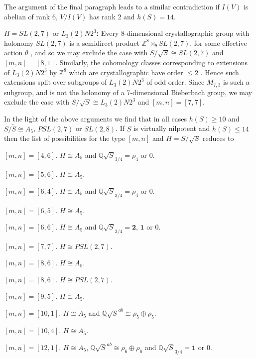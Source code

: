 \documentclass[12pt]{amsart}
\renewcommand{\geq}{\geqslant}
\renewcommand{\leq}{\leqslant}
\begin{document}
The argument of the final paragraph  leads to a similar contradiction if $I(V)$ 
is abelian of rank 6, $V/I(V)$ has rank 2  and $h(S)=14$. 


\medskip
\noindent$H=SL(2,7)$ or $L_3(2)N2^3${\bf :}
Every 8-dimensional crystallographic group with holonomy $SL(2,7)$
is a semidirect product $\mathbb{Z}^8\rtimes_\theta{SL(2,7)}$,
for some effective action $\theta$ \cite[page 295]{HP},
and so we may exclude the case with $S/\sqrt{S}\cong{SL(2,7)}$ and $[m,n]=[8,1]$.
Similarly, the cohomology classes corresponding to extensions
of $L_3(2)N2^3$ by $\mathbb{Z}^8$ which are crystallographic 
have order $\leq2$ \cite[page 298]{HP}.
Hence such extensions split over subgroups of $L_3(2)N2^3$ of odd order.
Since $M_{7,3}$ is such a subgroup, 
and is not the holonomy of a 7-dimensional Bieberbach group,
we may exclude the case with $S/\sqrt{S}\cong{L_3(2)N2^3}$ and $[m,n]=[7,7]$.

\medskip
In the light of the above arguments we find that in all cases
${h(S)\geq10}$ and $S/\widetilde{S}\cong{A_5}$,  $PSL(2,7)$ or $SL(2,8)$.
If $S$ is virtually nilpotent and $h(S)\leq14$ then the list of possibilities for 
the type $[m,n]$ and $H=S/\sqrt{S}$ reduces to

$[m,n]=[4,6]$.  $H\cong{A_5}$ and $\mathbb{Q}\sqrt{S}_{3/4}=\rho_4$ or 0.

$[m,n]=[5,6]$.  $H\cong{A_5}$. 

$[m,n]=[6,4]$.   $H\cong{A_5}$ and $\mathbb{Q}\sqrt{S}_{3/4}=\rho_4$ or 0.

$[m,n]=[6,5]$.   $H\cong{A_5}$.

$[m,n]=[6,6]$.  $H\cong{A_5}$ and $\mathbb{Q}\sqrt{S}_{3/4}=\mathbf{2}$, 
$\mathbf{1}$ or 0.

$[m,n]=[7,7]$.  $H\cong{PSL(2,7)}$.

$[m,n]=[8,6]$.  $H\cong{A_5}$.

$[m,n]=[8,6]$.  $H\cong{PSL(2,7)}$.

$[m,n]=[9,5]$.  $H\cong{A_5}$.

$[m,n]=[10,1]$.  $H\cong{A_5}$ and $\mathbb{Q}\sqrt{S}^{ab}\cong\rho_5\oplus\rho_5$.

$[m,n]=[10,4]$.  $H\cong{A_5}$.

$[m,n]=[12,1]$.  $H\cong{A_5}$, $\mathbb{Q}\sqrt{S}^{ab}\cong\rho_6\oplus\rho_6$
and $\mathbb{Q}\sqrt{S}_{3/4}=\mathbf{1}$ or 0.
\end{document}
